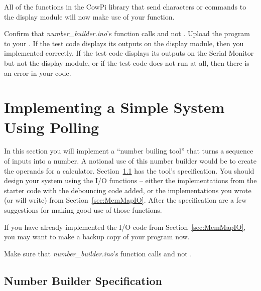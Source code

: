 All of the functions in the CowPi library that send characters or commands to the display module will now make use of your  function.

Confirm that \textit{number\_builder.ino}'s  function calls  and not .
Upload the program to your \developmentboard.
If the test code displays its outputs on the display module, then you implemented  correctly. If the test code displays its outputs on the Serial Monitor but not the display module, or if the test code does not run at all, then there is an error in your code.



\section {Implementing a Simple System Using Polling} \label{sec:SimpleSystem}

In this section you will implement a ``number builing tool'' that turns a sequence of inputs into a number.
A notional use of this number builder would be to create the operands for a calculator.
Section~\ref{sec:FunctionalSpecification} has the tool's specification.
You should design your system using the I/O functions -- either the implementations from the starter code with the debouncing code added, or the implementations you wrote (or will write) from Section~\ref{sec:MemMapIO}.
After the specification are a few suggestions for making good use of those functions.

If you have already implemented the I/O code from Section~\ref{sec:MemMapIO}, you may want to make a backup copy of your program now.

Make sure that \textit{number\_builder.ino}'s  function calls  and not .


\subsection{Number Builder Specification} \label{sec:FunctionalSpecification}

